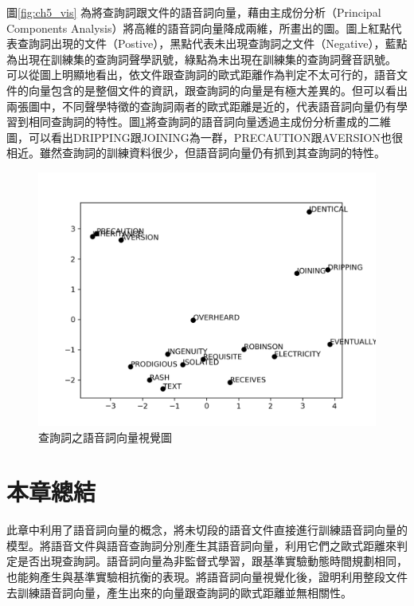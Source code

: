 圖\ref{fig:ch5_vis} 為將查詢詞跟文件的語音詞向量，藉由主成份分析（Principal
Components
Analysis）\cite{dunteman1989principal}將高維的語音詞向量降成兩維，所畫出的圖。圖上紅點代表查詢詞出現的文件（Postive），黑點代表未出現查詢詞之文件（Negative），藍點為出現在訓練集的查詢詞聲學訊號，綠點為未出現在訓練集的查詢詞聲音訊號。
可以從圖上明顯地看出，依文件跟查詢詞的歐式距離作為判定不太可行的，語音文件的向量包含的是整個文件的資訊，跟查詢詞的向量是有極大差異的。但可以看出兩張圖中，不同聲學特徵的查詢詞兩者的歐式距離是近的，代表語音詞向量仍有學習到相同查詢詞的特性。圖\ref{ch5_query_vis}將查詢詞的語音詞向量透過主成份分析畫成的二維圖，可以看出DRIPPING跟JOINING為一群，PRECAUTION跟AVERSION也很相近。雖然查詢詞的訓練資料很少，但語音詞向量仍有抓到其查詢詞的特性。

\begin{figure}[h]
\centering
\includegraphics[scale=0.7]{images/ch5_query_vis.png} 
\caption{查詢詞之語音詞向量視覺圖}
\label{ch5_query_vis}
\end{figure}
\section{本章總結}
此章中利用了語音詞向量的概念，將未切段的語音文件直接進行訓練語音詞向量的模型。將語音文件與語音查詢詞分別產生其語音詞向量，利用它們之歐式距離來判定是否出現查詢詞。語音詞向量為非監督式學習，跟基準實驗動態時間規劃相同，也能夠產生與基準實驗相抗衡的表現。將語音詞向量視覺化後，證明利用整段文件去訓練語音詞向量，產生出來的向量跟查詢詞的歐式距離並無相關性。
